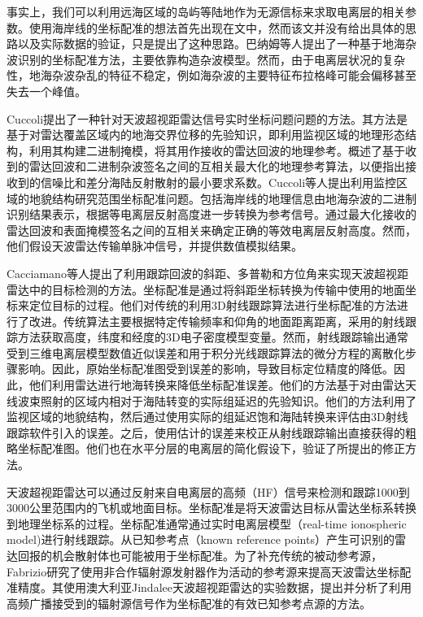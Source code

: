 事实上，我们可以利用远海区域的岛屿等陆地作为无源信标来求取电离层的相关参数。使用海岸线的坐标配准的想法首先出现在文\cite{wheadon1994ionospheric}中，然而该文并没有给出具体的思路以及实际数据的验证，只是提出了这种思路。巴纳姆等人\cite{barnum1998over}提出了一种基于地海杂波识别的坐标配准方法，主要依靠构造杂波模型。然而，由于电离层状况的复杂性，地海杂波杂乱的特征不稳定，例如海杂波的主要特征布拉格峰可能会偏移甚至失去一个峰值。

Cuccoli\cite{cuccoli2009over, cuccoli2009over2, cuccoli2010sea, cuccoli2011coordinate}提出了一种针对天波超视距雷达信号实时坐标问题问题的方法。其方法是基于对雷达覆盖区域内的地海交界位移的先验知识，即利用监视区域的地理形态结构，利用其构建二进制掩模，将其用作接收的雷达回波的地理参考。概述了基于收到的雷达回波和二进制杂波签名之间的互相关最大化的地理参考算法，以便指出接收到的信噪比和差分海陆反射散射的最小要求系数。Cuccoli\cite{cuccoli2011coordinate}等人提出利用监控区域的地貌结构研究范围坐标配准问题。包括海岸线的地理信息由地海杂波的二进制识别结果表示，根据等电离层反射高度进一步转换为参考信号。通过最大化接收的雷达回波和表面掩模签名之间的互相关来确定正确的等效电离层反射高度。然而，他们假设天波雷达传输单脉冲信号，并提供数值模拟结果。

Cacciamano\cite{cacciamano2012coordinate}等人提出了利用跟踪回波的斜距、多普勒和方位角来实现天波超视距雷达中的目标检测的方法。坐标配准是通过将斜距坐标转换为传输中使用的地面坐标来定位目标的过程。他们对传统的利用3D射线跟踪算法进行坐标配准的方法进行了改进。传统算法主要根据特定传输频率和仰角的地面距离距离，采用的射线跟踪方法获取高度，纬度和经度的3D电子密度模型变量。然而，射线跟踪输出通常受到三维电离层模型数值近似误差和用于积分光线跟踪算法的微分方程的离散化步骤影响。因此，原始坐标配准图受到误差的影响，导致目标定位精度的降低。因此，他们利用雷达进行地海转换来降低坐标配准误差。他们的方法基于对由雷达天线波束照射的区域内相对于海陆转变的实际组延迟的先验知识。他们的方法利用了监视区域的地貌结构，然后通过使用实际的组延迟饱和海陆转换来评估由3D射线跟踪软件引入的误差。之后，使用估计的误差来校正从射线跟踪输出直接获得的粗略坐标配准图。他们也在水平分层的电离层的简化假设下，验证了所提出的修正方法。

天波超视距雷达可以通过反射来自电离层的高频（HF）信号来检测和跟踪1000到3000公里范围内的飞机或地面目标。坐标配准是将天波雷达目标从雷达坐标系转换到地理坐标系的过程。坐标配准通常通过实时电离层模型（real-time ionospheric model)进行射线跟踪。从已知参考点（known reference points）产生可识别的雷达回报的机会散射体也可能被用于坐标配准。为了补充传统的被动参考源，Fabrizio\cite{fabrizio2016using}研究了使用非合作辐射源发射器作为活动的参考源来提高天波雷达坐标配准精度。其使用澳大利亚Jindalee天波超视距雷达的实验数据，提出并分析了利用高频广播接受到的辐射源信号作为坐标配准的有效已知参考点源的方法。

